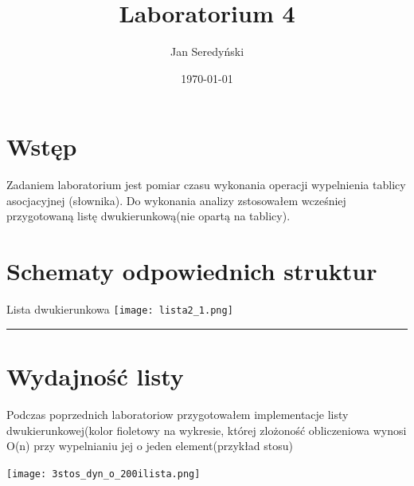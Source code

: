 \documentclass[11pt]{article}
\begin{document}
\title{Laboratorium 4}
\author{Jan Seredyński}
\date{\today}
\maketitle

\section{Wstęp}
Zadaniem laboratorium jest pomiar czasu wykonania operacji wypelnienia tablicy asocjacyjnej (słownika). Do wykonania analizy zstosowałem wcześniej przygotowaną listę dwukierunkową(nie opartą na tablicy).


\section{Schematy odpowiednich struktur}

Lista dwukierunkowa
\texttt{[image: lista2\_1.png]} 
\par\vspace{\baselineskip}
\hrule
\par\vspace{\baselineskip}


\section{Wydajność listy}
Podczas poprzednich laboratoriow przygotowałem implementacje listy dwukierunkowej(kolor fioletowy na wykresie, której zlożoność obliczeniowa wynosi O(n) przy wypelnianiu jej o jeden element(przykład stosu)
\par\vspace{\baselineskip}

\texttt{[image: 3stos\_dyn\_o\_200ilista.png]}
\end{document}
